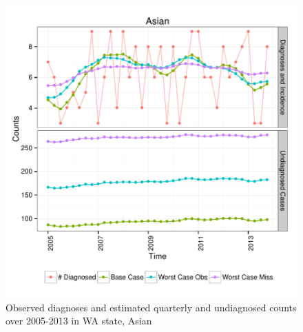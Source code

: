 \documentclass{article}\usepackage[]{graphicx}\usepackage[]{color}
\makeatletter
\def\maxwidth{ %
  \ifdim\Gin@nat@width>\linewidth
    \linewidth
  \else
    \Gin@nat@width
  \fi
}
\newenvironment{knitrout}{}{} %
\makeatother
\begin{document}
\begin{knitrout}\footnotesize
{}\color{fgcolor}\begin{figure}[]


{\centering \includegraphics[width=\maxwidth]{figure/minimal-plot_subgroup_Asian} 

}

\caption[Observed diagnoses and estimated quarterly and undiagnosed counts over 2005-2013 in WA state, Asian]{Observed diagnoses and estimated quarterly and undiagnosed counts over 2005-2013 in WA state, Asian\label{fig:plot_subgroup_Asian}}
\end{figure}


\end{knitrout}
\end{document}
